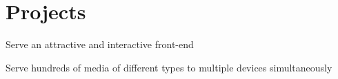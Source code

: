 \documentclass[]{deedy-resume-openfont}
\begin{document}
\begin{minipage}[t]{0.95\textwidth}




\section{Projects}



\begin{tightemize}
\item Serve an attractive and interactive front-end
\item Serve hundreds of media of different types to multiple devices simultaneously
\end{tightemize}


\end{minipage}
\end{document}
